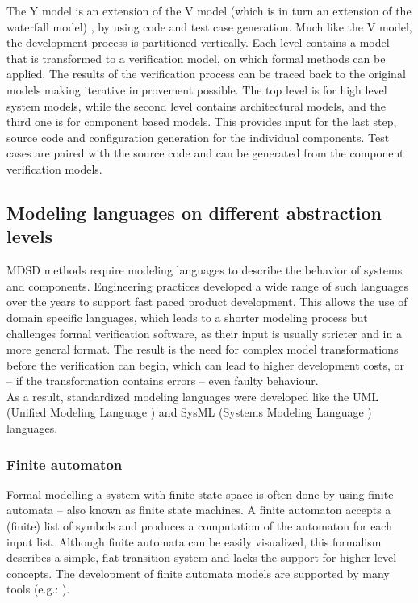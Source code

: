 The Y model \citep{ymodel} is an extension of the V model (which is in turn an extension of the waterfall model) \citep{randomwikipedialink3}, by using code and test case generation. Much like the V model, the development process is partitioned vertically. Each level contains a model that is transformed to a verification model, on which formal methods can be applied. The results of the verification process can be traced back to the original models making iterative improvement possible. The top level is for high level system models, while the second level contains architectural models, and the third one is for component based models. This provides input for the last step, source code and configuration generation for the individual components. Test cases are paired with the source code and can be generated from the component verification models.

\subsection{Modeling languages on different abstraction levels}

MDSD methods require modeling languages to describe the behavior of systems and components. Engineering practices developed a wide range of such languages over the years to support fast paced product development. This allows the use of domain specific languages, which leads to a shorter modeling process but challenges formal verification software, as their input is usually stricter and in a more general format. The result is the need for complex model transformations before the verification can begin, which can lead to higher development costs, or -- if the transformation contains errors -- even faulty behaviour.\\
As a result, standardized modeling languages were developed like the UML (Unified Modeling Language \citep{uml}) and SysML (Systems Modeling Language \citep{sysml}) languages.

\subsubsection{Finite automaton}

Formal modelling a system with finite state space is often done by using finite automata -- also known as finite state machines. A finite automaton accepts a (finite) list of symbols and produces a computation of the automaton for each input list.
Although finite automata can be easily visualized, this formalism describes a simple, flat transition system and lacks the support for higher level concepts. The development of finite automata models  are supported by many tools (e.g.: \citep{fsmd}).

